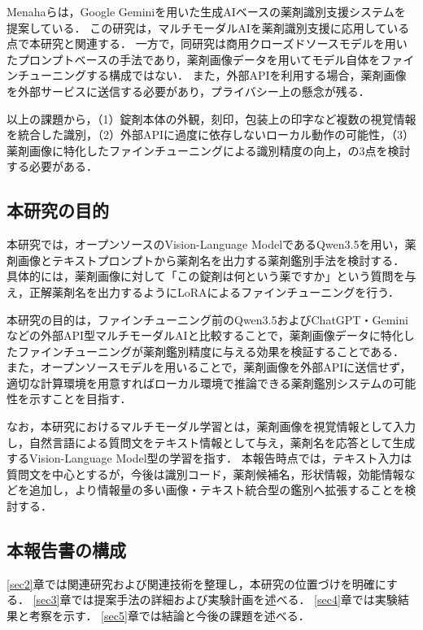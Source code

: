 \documentclass{jsarticle}
\begin{document}
Menahaら\cite{gemini2024pill}は，Google Geminiを用いた生成AIベースの薬剤識別支援システムを提案している．
この研究は，マルチモーダルAIを薬剤識別支援に応用している点で本研究と関連する．
一方で，同研究は商用クローズドソースモデルを用いたプロンプトベースの手法であり，薬剤画像データを用いてモデル自体をファインチューニングする構成ではない．
また，外部APIを利用する場合，薬剤画像を外部サービスに送信する必要があり，プライバシー上の懸念が残る．

以上の課題から，（1）錠剤本体の外観，刻印，包装上の印字など複数の視覚情報を統合した識別，（2）外部APIに過度に依存しないローカル動作の可能性，（3）薬剤画像に特化したファインチューニングによる識別精度の向上，の3点を検討する必要がある．

\subsection{本研究の目的}

本研究では，オープンソースのVision-Language ModelであるQwen3.5を用い，薬剤画像とテキストプロンプトから薬剤名を出力する薬剤鑑別手法を検討する．
具体的には，薬剤画像に対して「この錠剤は何という薬ですか」という質問を与え，正解薬剤名を出力するようにLoRAによるファインチューニングを行う．

本研究の目的は，ファインチューニング前のQwen3.5およびChatGPT・Geminiなどの外部API型マルチモーダルAIと比較することで，薬剤画像データに特化したファインチューニングが薬剤鑑別精度に与える効果を検証することである．
また，オープンソースモデルを用いることで，薬剤画像を外部APIに送信せず，適切な計算環境を用意すればローカル環境で推論できる薬剤鑑別システムの可能性を示すことを目指す．

なお，本研究におけるマルチモーダル学習とは，薬剤画像を視覚情報として入力し，自然言語による質問文をテキスト情報として与え，薬剤名を応答として生成するVision-Language Model型の学習を指す．
本報告時点では，テキスト入力は質問文を中心とするが，今後は識別コード，薬剤候補名，形状情報，効能情報などを追加し，より情報量の多い画像・テキスト統合型の鑑別へ拡張することを検討する．

\subsection{本報告書の構成}

\ref{sec2}章では関連研究および関連技術を整理し，本研究の位置づけを明確にする．
\ref{sec3}章では提案手法の詳細および実験計画を述べる．
\ref{sec4}章では実験結果と考察を示す．
\ref{sec5}章では結論と今後の課題を述べる．
\end{document}
